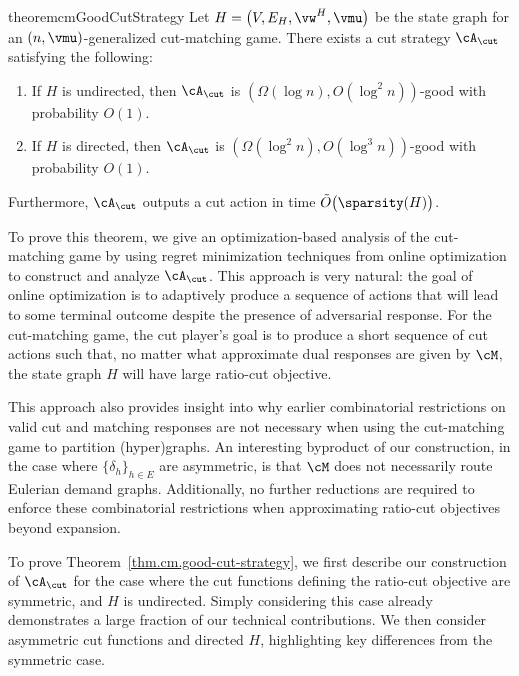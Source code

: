 \documentclass[letterpaper]{article}
\begin{document}
\begin{restatable}{theorem}{cmGoodCutStrategy}
\label{thm.cm.good-cut-strategy}
Let $H = \big(V, E_H, \vw^H, \vmu \big)$ be the state graph for an $(n, \vmu)$-generalized cut-matching game. There exists a cut strategy $\cA_{\cut}$ satisfying the following:
\begin{enumerate}
\item If $H$ is undirected, then $\cA_{\cut}$ is $\left( \Omega (\log n), O ( \log^2 n ) \right)$-good with probability $O(1)$.

\item If $H$ is directed, then $\cA_{\cut}$ is $\left( \Omega (\log^2 n), O ( \log^3 n ) \right)$-good with probability $O(1)$.
\end{enumerate}
Furthermore, $\cA_{\cut}$ outputs a cut action in time $\tilde{O}\big( \sparsity(H) \big)$.
\end{restatable}

To prove this theorem, we give an optimization-based analysis of the cut-matching game by using regret minimization techniques from online optimization to construct and analyze $\cA_{\cut}$. This approach is very natural: the goal of online optimization is to adaptively produce a sequence of actions that will lead to some terminal outcome despite the presence of adversarial response. For the cut-matching game, the cut player's goal is to produce a short sequence of cut actions such that, no matter what approximate dual responses are given by $\cM$, the state graph $H$ will have large ratio-cut objective.

This approach also provides insight into why earlier combinatorial restrictions on valid cut and matching responses are not necessary when using the cut-matching game to partition (hyper)graphs. An interesting byproduct of our construction, in the case where $\{ \delta_h \}_{h \in E}$ are asymmetric, is that $\cM$ does not necessarily route Eulerian demand graphs. Additionally, no further reductions are required to enforce these combinatorial restrictions when approximating ratio-cut objectives beyond expansion.

To prove Theorem~\ref{thm.cm.good-cut-strategy}, we first describe our construction of $\cA_{\cut}$ for the case where the cut functions defining the ratio-cut objective are symmetric, and $H$ is undirected. Simply considering this case already demonstrates a large fraction of our technical contributions. We then consider asymmetric cut functions and directed $H$, highlighting key differences from the symmetric case.
\end{document}
